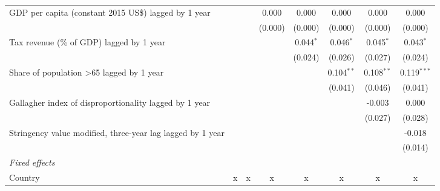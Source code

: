 \begin{tabular}{lccccccc}
   GDP per capita (constant 2015 US\$) lagged by 1 year                                  &                &               & 0.000         & 0.000         & 0.000          & 0.000          & 0.000\\   
                                                                                         &                &               & (0.000)       & (0.000)       & (0.000)        & (0.000)        & (0.000)\\   
   Tax revenue (\% of GDP) lagged by 1 year                                              &                &               &               & 0.044$^{*}$   & 0.046$^{*}$    & 0.045$^{*}$    & 0.043$^{*}$\\   
                                                                                         &                &               &               & (0.024)       & (0.026)        & (0.027)        & (0.024)\\   
   Share of population >65 lagged by 1 year                                              &                &               &               &               & 0.104$^{**}$   & 0.108$^{**}$   & 0.119$^{***}$\\   
                                                                                         &                &               &               &               & (0.041)        & (0.046)        & (0.041)\\   
   Gallagher index of disproportionality lagged by 1 year                                &                &               &               &               &                & -0.003         & 0.000\\   
                                                                                         &                &               &               &               &                & (0.027)        & (0.028)\\   
   Stringency value modified, three-year lag lagged by 1 year                            &                &               &               &               &                &                & -0.018\\   
                                                                                         &                &               &               &               &                &                & (0.014)\\   
   \emph{Fixed effects}\\
   Country                                                                               & x              & x             & x             & x             & x              & x              & x\\  

\end{tabular}
